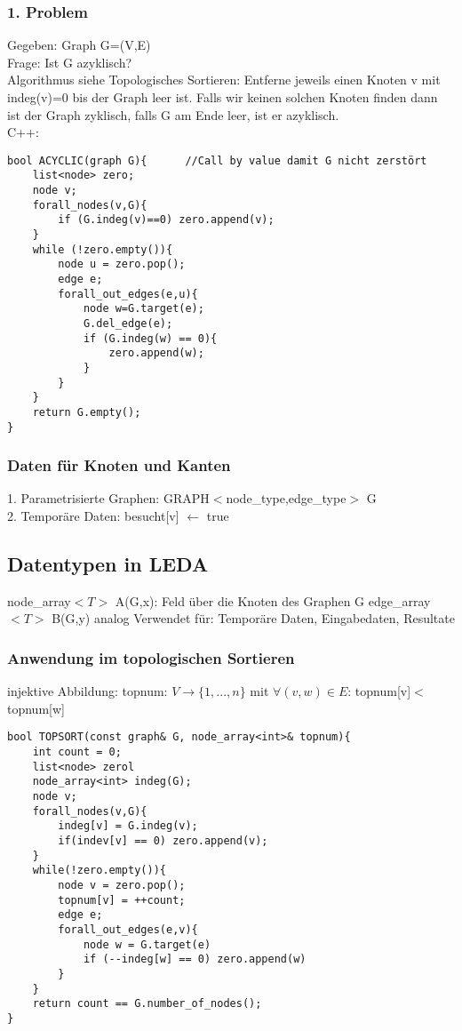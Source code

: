 \documentclass[a4paper]{article}
\begin{document}
\subsubsection*{1. Problem}
Gegeben: Graph G=(V,E)\\
Frage: Ist G azyklisch?\\
Algorithmus siehe Topologisches Sortieren: Entferne jeweils einen Knoten v mit indeg(v)=0 bis der Graph leer ist. Falls wir keinen solchen Knoten finden dann ist der Graph zyklisch, falls G am Ende leer, ist er azyklisch.\\
C++:\\
\begin{lstlisting}
bool ACYCLIC(graph G){ 		//Call by value damit G nicht zerstört
	list<node> zero;
	node v;
	forall_nodes(v,G){
		if (G.indeg(v)==0) zero.append(v);
	}
	while (!zero.empty()){
		node u = zero.pop();
		edge e;
		forall_out_edges(e,u){
			node w=G.target(e);
			G.del_edge(e);
			if (G.indeg(w) == 0){
				zero.append(w);
			}
		}
	}
	return G.empty();
}
\end{lstlisting}
\subsubsection*{Daten für Knoten und Kanten}
1. Parametrisierte Graphen: GRAPH$<$node\_type,edge\_type$>$ G\\
2. Temporäre Daten: besucht[v] $\leftarrow$ true
\subsection*{Datentypen in LEDA}
node\_array$<T>$ A(G,x): Feld über die Knoten des Graphen G
edge\_array$<T>$ B(G,y) analog
Verwendet für: Temporäre Daten, Eingabedaten, Resultate\\
\subsubsection*{Anwendung im topologischen Sortieren}
injektive Abbildung: topnum: $V\rightarrow \{1,...,n\}$ mit $\forall (v,w)\in E$: topnum[v]$<$topnum[w]\\
\begin{lstlisting}
bool TOPSORT(const graph& G, node_array<int>& topnum){
	int count = 0;
	list<node> zerol
	node_array<int> indeg(G);
	node v;
	forall_nodes(v,G){
		indeg[v] = G.indeg(v);
		if(indev[v] == 0) zero.append(v);
	}
	while(!zero.empty()){
		node v = zero.pop();
		topnum[v] = ++count;
		edge e;
		forall_out_edges(e,v){
			node w = G.target(e)
			if (--indeg[w] == 0) zero.append(w)
		}
	}
	return count == G.number_of_nodes();
}
\end{lstlisting}
\end{document}
